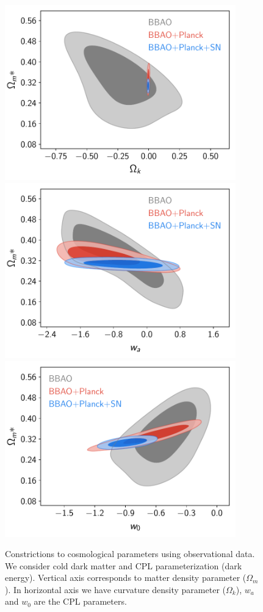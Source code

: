 \documentclass[onecolumn,           %
               showpacs,            %
               preprintnumbers,     %
               aps,                 %
               prl,          	    %
               letterpaper,             %
               superscriptaddress,      %
               nofootinbib,         %
               tightenlines,        %
               floats,floatfix      %
               ,usenatbib,
               ]{revtex4-1}
\begin{document}
\begin{figure}[htp]
	\centering
	\includegraphics[width=10cm]{FiguresCosmo/Ok_Om_owaCDM_todos.pdf}	
	\includegraphics[width=10cm]{FiguresCosmo/wa_Om_owaCDM_todos.pdf}
	\includegraphics[width=10cm]{FiguresCosmo/w_Om_owaCDM_todos}
	\caption{Constrictions to cosmological parameters using observational data. We consider cold dark matter and CPL parameterization (dark energy). Vertical axis corresponds to matter density parameter ($\Omega_m$). In horizontal axis we have curvature density parameter ($\Omega_k$), $w_a$ and $w_0$ are the CPL parameters.}
	\label{cosmo1}
\end{figure}
\end{document}
